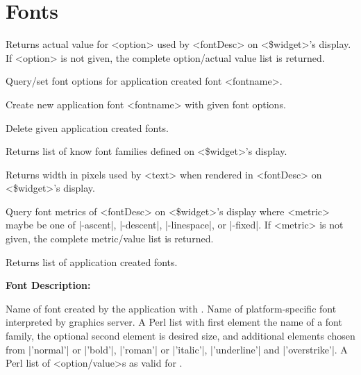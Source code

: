 
\section{Fonts}
\begin{enum}{1cm}

Returns actual value for <option> used by <fontDesc> on <\$widget>'s display.
If <option> is not given, the complete option/actual value list is returned.
 
Query/set font options for application created font <fontname>.

Create new application font <fontname> with given font options.

Delete given application created fonts.

Returns list of know font families defined on <\$widget>'s display.

Returns width in pixels used by <text> when rendered in <fontDesc>
on <\$widget>'s display.

Query font metrics of <fontDesc> on <\$widget>'s display where <metric>
maybe be one of |-ascent|, |-descent|, |-linespace|, or |-fixed|. If
<metric> is not given, the complete metric/value list is returned.

Returns list of application created fonts.

\end{enum}

\vskip6pt
{\bf Font Description:}
\begin{enum}{1cm}
Name of font created by the application with .
Name of platform-specific font interpreted by graphics server.
A Perl list with first element the name of a font family, the
optional second element is desired size, and additional elements
chosen from |'normal'| or |'bold'|, |'roman'| or |'italic'|, |'underline'|
and |'overstrike'|.
A Perl list of <option/value>s as valid for .
\end{enum}


